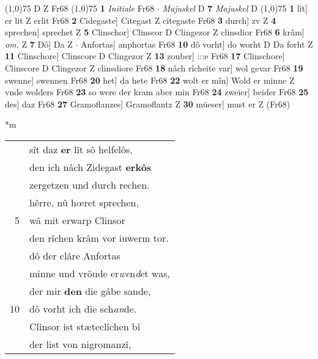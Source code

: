 \documentclass[8pt,a4paper,notitlepage]{article}
\begin{document}
\begin{table}[ht]
\begin{minipage}[t]{0.5\linewidth}
\begin{tabular}{rl}
\end{tabular}
\scriptsize
\line(1,0){75} \newline
D Z Fr68 \newline
\line(1,0){75} \newline
\textbf{1} \textit{Initiale} Fr68   $\cdot$ \textit{Majuskel} D  \textbf{7} \textit{Majuskel} D  \newline
\line(1,0){75} \newline
\textbf{1} lît] er lit Z erlit Fr68 \textbf{2} Cidegaste] Citegast Z citegaste Fr68 \textbf{3} durch] zv Z \textbf{4} sprechen] sprechet Z \textbf{5} Clinschor] Clinscor D Clingezor Z clinsdior Fr68 \textbf{6} krâm] \textit{om.} Z \textbf{7} Dô] Da Z  $\cdot$ Anfortas] anphortas Fr68 \textbf{10} dô vorht] do worht D Da forht Z \textbf{11} Clinschore] Clinscore D Clingezor Z \textbf{13} zouber] :::e Fr68 \textbf{17} Clinschore] Clinscore D Clingezor Z clinsdiore Fr68 \textbf{18} nâch rîcheite var] wol gevar Fr68 \textbf{19} swenne] swennen Fr68 \textbf{20} het] da hete Fr68 \textbf{22} wolt er mîn] Wold er minne Z vnde wolders Fr68 \textbf{23} so were der kram aber min Fr68 \textbf{24} zweier] beider Fr68 \textbf{25} des] daz Fr68 \textbf{27} Gramoflanzes] Gramoflantz Z \textbf{30} müeser] must er Z (Fr68) \newline
\end{minipage}
\hspace{0.5cm}
\begin{minipage}[t]{0.5\linewidth}
\small
\begin{center}*m
\end{center}
\begin{tabular}{rl}
 & sît daz \textbf{er} lît sô helfelôs,\\ 
 & den ich nâch Zidegast \textbf{erkôs}\\ 
 & zergetzen und durch rechen.\\ 
 & hêrre, nû hœret sprechen,\\ 
5 & wâ mit erwarp Clinsor\\ 
 & den rîchen krâm vor iuwerm tor.\\ 
 & dô der clâre Anfortas\\ 
 & minne und vröude er\textit{we}n\textit{d}et was,\\ 
 & der mir \textbf{den} die gâbe sande,\\ 
10 & dô vorht ich die sch\textit{an}de.\\ 
 & Clinsor ist stæteclîchen bî\\ 
 & der list von nigromanzî,\\ 

\end{tabular}
\end{minipage}
\end{table}
\end{document}
